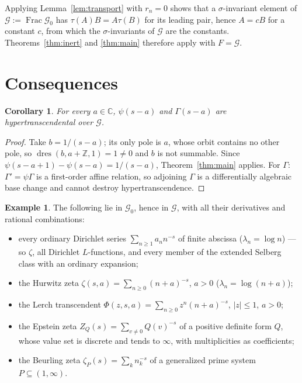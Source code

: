 \documentclass[11pt,a4paper]{amsart}
\theoremstyle{plain}
\newtheorem{corollary}[theorem]{Corollary}
\theoremstyle{definition}
\newtheorem{example}[theorem]{Example}
\newcommand{\CC}{\mathbb{C}}
\newcommand{\ZZ}{\mathbb{Z}}
\newcommand{\sig}{\sigma}
\newcommand{\dres}{\operatorname{dres}}
\newcommand{\Frac}{\operatorname{Frac}}
\newcommand{\GG}{\mathcal{G}}
\begin{document}
Applying Lemma~\ref{lem:transport} with $r_n=0$ shows that a $\sig$-invariant element of
$\GG:=\Frac\GG_0$ has $\tau(A)B=A\tau(B)$ for its leading pair, hence $A=cB$ for a constant $c$, from
which the $\sig$-invariants of $\GG$ are the constants. Theorems~\ref{thm:inert} and \ref{thm:main}
therefore apply with $F=\GG$.

\section{Consequences}\label{sec:cor}

\begin{corollary}\label{cor:holder}
For every $a\in\CC$, $\psi(s-a)$ and $\Gamma(s-a)$ are hypertranscendental over $\GG$.
\end{corollary}
\begin{proof}
Take $b=1/(s-a)$; its only pole is $a$, whose orbit contains no other pole, so
$\dres(b,a+\ZZ,1)=1\neq0$ and $b$ is not summable. Since $\psi(s-a+1)-\psi(s-a)=1/(s-a)$,
Theorem~\ref{thm:main} applies. For $\Gamma$: $\Gamma'=\psi\Gamma$ is a first-order affine relation,
so adjoining $\Gamma$ is a differentially algebraic base change and cannot destroy
hypertranscendence.
\end{proof}

\begin{example}\label{ex:members}
The following lie in $\GG_0$, hence in $\GG$, with all their derivatives and rational combinations:
\begin{itemize}
\item every ordinary Dirichlet series $\sum_{n\ge1}a_nn^{-s}$ of finite abscissa ($\lambda_n=\log n$)
  --- so $\zeta$, all Dirichlet $L$-functions, and every member of the extended Selberg class with an
  ordinary expansion;
\item the Hurwitz zeta $\zeta(s,a)=\sum_{n\ge0}(n+a)^{-s}$, $a>0$ ($\lambda_n=\log(n+a)$);
\item the Lerch transcendent $\Phi(z,s,a)=\sum_{n\ge0}z^n(n+a)^{-s}$, $|z|\le1$, $a>0$;
\item the Epstein zeta $Z_Q(s)=\sum_{v\neq0}Q(v)^{-s}$ of a positive definite form $Q$, whose value
  set is discrete and tends to $\infty$, with multiplicities as coefficients;
\item the Beurling zeta $\zeta_P(s)=\sum_kn_k^{-s}$ of a generalized prime system $P\subseteq(1,\infty)$.
\end{itemize}
\end{example}
\end{document}
